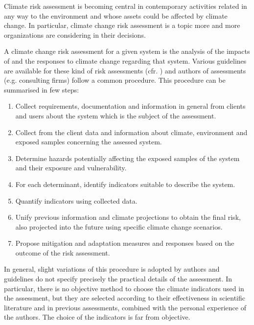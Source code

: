 Climate risk assessment is becoming central in contemporary activities related in any way to the environment and whose assets could be affected by climate change.
In particular, climate change risk assessment is a topic more and more organizations are considering in their decisions.

A climate change risk assessment for a given system is the analysis of the impacts of and the responses to climate change regarding that system. Various guidelines are available for these kind of risk assessments (cfr. \cite{2021ISO14091,2024EEAExecutiveSummary,2017GIZTheVulnerability}) and authors of assessments (e.g. consulting firms) follow a common procedure.
This procedure can be summarised in few steps:
\begin{enumerate}
  \item Collect requirements, documentation and information in general from clients and users about the system which is the subject of the assessment.
  \item Collect from the client data and information about climate, environment and exposed samples concerning the assessed system.
  \item Determine hazards potentially affecting the exposed samples of the system and their exposure and vulnerability.
  \item For each determinant, identify indicators suitable to describe the system.
  \item Quantify indicators using collected data.
  \item Unify previous information and climate projections to obtain the final risk, also projected into the future using specific climate change scenarios.
  \item Propose mitigation and adaptation measures and responses based on the outcome of the risk assessment.
\end{enumerate}

In general, slight variations of this procedure is adopted by authors and guidelines do not specify precisely the practical details of the assessment. In particular, there is no objective method to choose the climate indicators used in the assessment, but they are selected according to their effectiveness in scientific literature and in previous assessments, combined with the personal experience of the authors. The choice of the indicators is far from objective.
